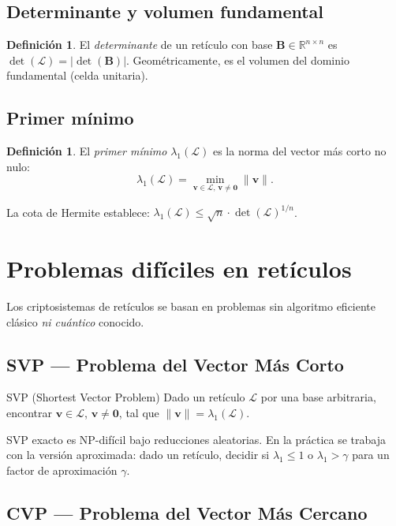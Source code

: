 \documentclass[12pt,a4paper,twoside,openright]{book}
\theoremstyle{plain}
\theoremstyle{definition}
\newtheorem{defn}[thm]{Definici\'{o}n}
\theoremstyle{remark}
\newcommand{\R}{\mathbb{R}}
\newcommand{\vv}[1]{\mathbf{#1}}
\newcommand{\mm}[1]{\mathbf{#1}}
\begin{document}
\subsection{Determinante y volumen fundamental}

\begin{defn}
  El \emph{determinante} de un ret\'iculo con base $\mm{B} \in \R^{n\times n}$
  es $\det(\mathcal{L}) = |\det(\mm{B})|$. Geom\'etricamente, es el volumen
  del dominio fundamental (celda unitaria).
\end{defn}

\subsection{Primer m\'inimo}

\begin{defn}
  El \emph{primer m\'inimo} $\lambda_1(\mathcal{L})$ es la norma del vector
  m\'as corto no nulo:
  \[
    \lambda_1(\mathcal{L}) = \min_{\vv{v} \in \mathcal{L},\, \vv{v}\neq\vv{0}}
    \|\vv{v}\|.
  \]
\end{defn}

La cota de Hermite establece:
$\lambda_1(\mathcal{L}) \leq \sqrt{n} \cdot \det(\mathcal{L})^{1/n}$.

\section{Problemas dif\'iciles en ret\'iculos}

Los criptosistemas de ret\'iculos se basan en problemas sin algoritmo
eficiente cl\'asico \emph{ni cu\'antico} conocido.

\subsection{SVP --- Problema del Vector M\'as Corto}

\begin{midef}{SVP (Shortest Vector Problem)}
  Dado un ret\'iculo $\mathcal{L}$ por una base arbitraria, encontrar
  $\vv{v} \in \mathcal{L}$, $\vv{v}\neq\vv{0}$, tal que
  $\|\vv{v}\| = \lambda_1(\mathcal{L})$.
\end{midef}

SVP exacto es NP-dif\'icil bajo reducciones aleatorias. En la pr\'actica se
trabaja con la versi\'on aproximada: dado un ret\'iculo, decidir si
$\lambda_1 \leq 1$ o $\lambda_1 > \gamma$ para un factor de aproximaci\'on
$\gamma$.

\subsection{CVP --- Problema del Vector M\'as Cercano}
\end{document}

